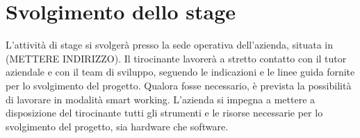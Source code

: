 \section{Svolgimento dello stage}
L'attività di stage si svolgerà presso la sede operativa dell'azienda, situata in (METTERE INDIRIZZO). Il tirocinante lavorerà a stretto contatto con il tutor aziendale e con il team di sviluppo, seguendo le indicazioni e le linee guida fornite per lo svolgimento del progetto. Qualora fosse necessario, è prevista la possibilità di lavorare in modalità smart working. L'azienda si impegna a mettere a disposizione del tirocinante tutti gli strumenti e le risorse necessarie per lo svolgimento del progetto, sia hardware che software.
